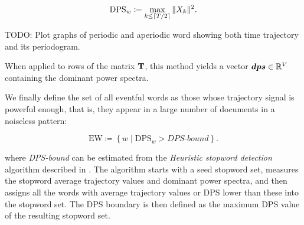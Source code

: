 \begin{equation}
	\text{DPS}_{w} \coloneqq \max\limits_{k \leq \lceil T / 2\rceil}{\|X_{k}\|^{2}}.
\end{equation}

{\color{red} TODO: Plot graphs of periodic and aperiodic word showing both time trajectory and its periodogram.}

When applied to rows of the matrix $\mathbf{T}$, this method yields a vector $\vect{DPS} \in \R^{\featcount}$ containing the dominant power spectra.

We finally define the set of all eventful words as those whose trajectory signal is powerful enough, that is, they appear in a large number of documents in a noiseless pattern:

\begin{equation}
	\text{EW} \coloneqq \left\{ w \mid \text{DPS}_{w} > \textit{DPS-bound} \right\}.
\end{equation}

where \textit{DPS-bound} can be estimated from the \textit{Heuristic stopword detection} algorithm described in \cite{event-detection}. The algorithm starts with a seed stopword set, measures the stopword average trajectory  values and dominant power spectra, and then assigns all the words with average trajectory values or DPS lower than these into the stopword set. The DPS boundary is then defined as the maximum DPS value of the resulting stopword set.